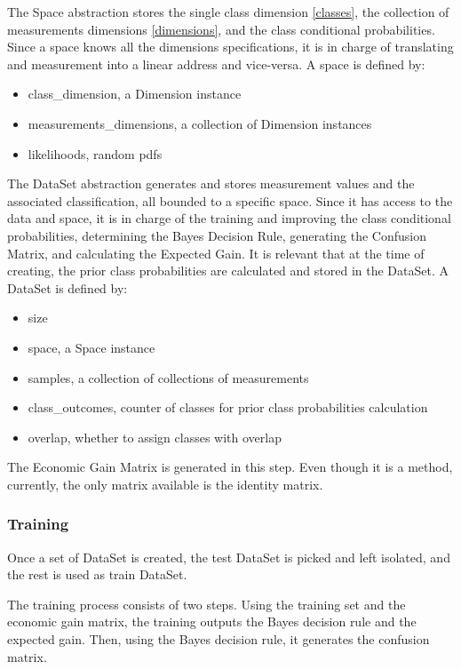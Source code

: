 \documentclass[letterpaper, conference]{IEEEtran}
\begin{document}
The Space abstraction stores the single class dimension \ref{classes}, the collection of measurements dimensions \ref{dimensions}, and the class conditional probabilities. Since a space knows all the dimensions specifications, it is in charge of translating and measurement into a linear address and vice-versa. A space is defined by:

\begin{itemize}
\item class\_dimension, a Dimension instance
\item measurements\_dimensions, a collection of Dimension instances
\item likelihoods, random pdfs
\end{itemize}

The DataSet abstraction generates and stores measurement values and the associated classification, all bounded to a specific space. Since it has access to the data and space, it is in charge of the training and improving the class conditional probabilities, determining the Bayes Decision Rule, generating the Confusion Matrix, and calculating the Expected Gain. It is relevant that at the time of creating, the prior class probabilities are calculated and stored in the DataSet. A DataSet is defined by:

\begin{itemize}
\item size
\item space, a Space instance
\item samples, a collection of collections of measurements
\item class\_outcomes, counter of classes for prior class probabilities calculation
\item overlap, whether to assign classes with overlap
\end{itemize}

The Economic Gain Matrix is generated in this step. Even though it is a method, currently, the only matrix available is the identity matrix.

\subsubsection{Training}

Once a set of DataSet is created, the test DataSet is picked and left isolated, and the rest is used as train DataSet.

The training process consists of two steps. Using the training set and the economic gain matrix, the training outputs the Bayes decision rule and the expected gain. Then, using the Bayes decision rule, it generates the confusion matrix.
\end{document}
